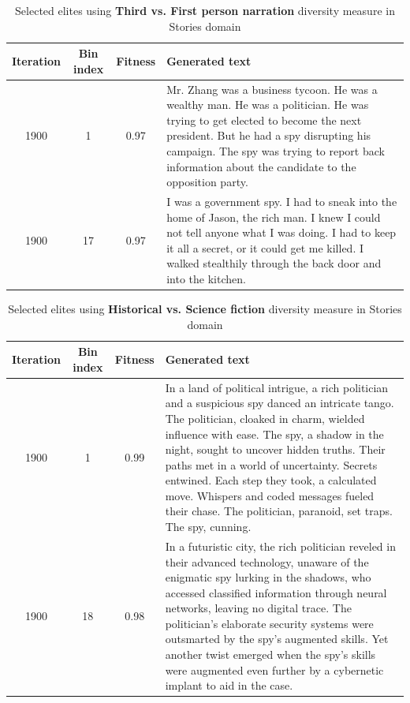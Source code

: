 \begin{table}[H]
  \caption{Selected elites using \textbf{Third vs. First person narration} diversity measure in Stories domain}
  \label{tab:dm-third-first-person}
  \begin{center}
  \begin{tabular}{cccp{8.5cm}}
    \toprule
    Iteration     & Bin index  & Fitness     & Generated text \\
    \midrule
    1900 &  1 & 0.97 & Mr. Zhang was a business tycoon. He was a wealthy man. He was a politician. He was trying to get elected to become the next president. But he had a spy disrupting his campaign. The spy was trying to report back information about the candidate to the opposition party. \\
    \midrule
    1900 & 17 & 0.97 & I was a government spy. I had to sneak into the home of Jason, the rich man. I knew I could not tell anyone what I was doing. I had to keep it all a secret, or it could get me killed. I walked stealthily through the back door and into the kitchen. \\
    \bottomrule
  \end{tabular}
  \end{center}
\end{table}

\begin{table}[H]
  \caption{Selected elites using \textbf{Historical vs. Science fiction} diversity measure in Stories domain}
  \label{tab:dm-historical-science-fiction}
  \begin{center}
  \begin{tabular}{cccp{8.5cm}}
    \toprule
    Iteration     & Bin index  & Fitness     & Generated text \\
    \midrule
    1900 &  1 & 0.99 & In a land of political intrigue, a rich politician and a suspicious spy danced an intricate tango. The politician, cloaked in charm, wielded influence with ease. The spy, a shadow in the night, sought to uncover hidden truths. Their paths met in a world of uncertainty. Secrets entwined. Each step they took, a calculated move. Whispers and coded messages fueled their chase. The politician, paranoid, set traps. The spy, cunning. \\
    \midrule
    1900 & 18 & 0.98 & In a futuristic city, the rich politician reveled in their advanced technology, unaware of the enigmatic spy lurking in the shadows, who accessed classified information through neural networks, leaving no digital trace. The politician's elaborate security systems were outsmarted by the spy's augmented skills. Yet another twist emerged when the spy's skills were augmented even further by a cybernetic implant to aid in the case. \\
    \bottomrule
  \end{tabular}
  \end{center}
\end{table}

